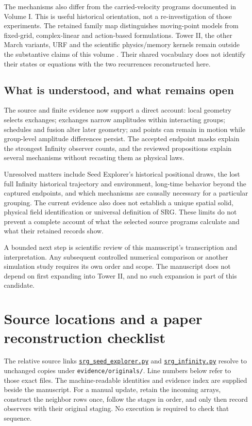 \documentclass[11pt,a4paper]{article}
\begin{document}
The mechanisms also differ from the carried-velocity programs documented in Volume I. This is useful historical orientation, not a re-investigation of those experiments. The retained family map distinguishes moving-point models from fixed-grid, complex-linear and action-based formulations. Tower II, the other March variants, URF and the scientific physics/memory kernels remain outside the substantive claims of this volume \cite{families}. Their shared vocabulary does not identify their states or equations with the two recurrences reconstructed here.

\subsection{What is understood, and what remains open}
The source and finite evidence now support a direct account: local geometry selects exchanges; exchanges narrow amplitudes within interacting groups; schedules and fusion alter later geometry; and points can remain in motion while group-level amplitude differences persist. The accepted endpoint masks explain the strongest Infinity observer counts, and the reviewed propositions explain several mechanisms without recasting them as physical laws.

Unresolved matters include Seed Explorer's historical positional draws, the lost full Infinity historical trajectory and environment, long-time behavior beyond the captured endpoints, and which mechanisms are causally necessary for a particular grouping. The current evidence also does not establish a unique spatial solid, physical field identification or universal definition of SRG. These limits do not prevent a complete account of what the selected source programs calculate and what their retained records show.

A bounded next step is scientific review of this manuscript's transcription and interpretation. Any subsequent controlled numerical comparison or another simulation study requires its own order and scope. The manuscript does not depend on first expanding into Tower II, and no such expansion is part of this candidate.

\appendix
\section{Source locations and a paper reconstruction checklist}
\label{app:locators}
The relative source links \href{evidence/originals/SIM04/srg_seed_explorer.py}{\texttt{srg\_seed\_explorer.py}} and \href{evidence/originals/SIM05/srg_infinity.py}{\texttt{srg\_infinity.py}} resolve to unchanged copies under \texttt{evidence/originals/}. Line numbers below refer to those exact files. The machine-readable identities and evidence index are supplied beside the manuscript. For a manual update, retain the incoming arrays, construct the neighbor rows once, follow the stages in order, and only then record observers with their original staging. No execution is required to check that sequence.
\end{document}
